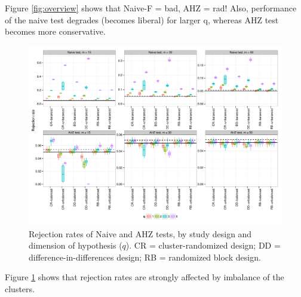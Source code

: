 \documentclass[12pt]{article}\usepackage[]{graphicx}\usepackage[]{color}
\newenvironment{knitrout}{}{} %
\begin{document}
Figure \ref{fig:overview} shows that Naive-F = bad, AHZ = rad! Also, performance of the naive test degrades (becomes liberal) for larger q, whereas AHZ test becomes more conservative.

\begin{knitrout}
\color{fgcolor}\begin{figure}

{\centering \includegraphics[width=\linewidth]{CR_fig/balance-1} 

}

\caption[Rejection rates of Naive and AHZ tests, by study design and dimension of hypothesis (]{Rejection rates of Naive and AHZ tests, by study design and dimension of hypothesis ($q$). CR = cluster-randomized design; DD = difference-in-differences design; RB = randomized block design.}\label{fig:balance}
\end{figure}


\end{knitrout}

Figure \ref{fig:balance} shows that rejection rates are strongly affected by imbalance of the clusters.
\end{document}
